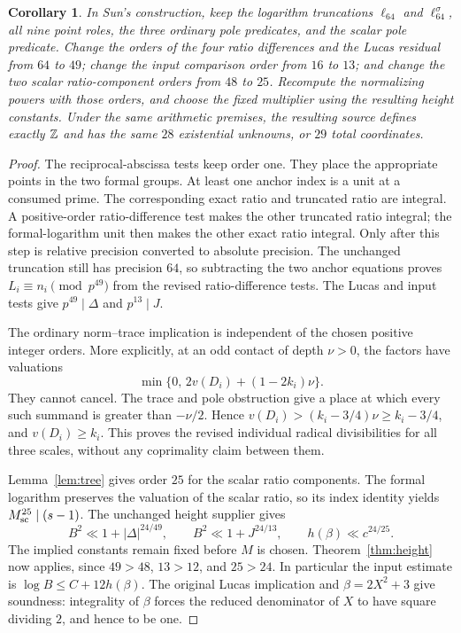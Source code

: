 \documentclass[11pt,a4paper]{article}
\newtheorem{corollary}[theorem]{Corollary}
\begin{document}
\begin{corollary}\label{cor:Sun}
In Sun's construction, keep the logarithm truncations $\ell_{64}$ and
$\ell_{64}^{\sigma}$, all nine point roles, the three ordinary pole
predicates, and the scalar pole predicate. Change the orders of the
four ratio differences and the Lucas residual from $64$ to $49$;
change the input comparison order from $16$ to $13$; and change the two
scalar ratio-component orders from $48$ to $25$.
Recompute the normalizing powers with those orders, and choose the
fixed multiplier using the resulting height constants.
Under the same arithmetic premises, the resulting source defines exactly
$\mathbb Z$ and has the same $28$ existential unknowns, or $29$ total coordinates.
\end{corollary}
\begin{proof}
The reciprocal-abscissa tests keep order one. They place the appropriate
points in the two formal groups. At least one anchor index is a unit
at a consumed prime. The corresponding exact ratio and truncated ratio
are integral. A positive-order ratio-difference test makes the other
truncated ratio integral; the formal-logarithm unit then makes the
other exact ratio integral. Only after this step is relative precision
converted to absolute precision. The unchanged truncation still has
precision $64$, so subtracting the two anchor equations proves
$L_i\equiv n_i\pmod {p^{49}}$ from the revised ratio-difference tests.
The Lucas and input tests give $p^{49}\mid\Delta$ and $p^{13}\mid J$.

The ordinary norm--trace implication is independent of the chosen
positive integer orders. More explicitly, at an odd contact of depth
$\nu>0$, the factors have valuations
\[
 \min\{0,\,2v(D_i)+(1-2k_i)\nu\}.
\]
They cannot cancel. The trace and pole obstruction give a place at
which every such summand is greater than $-\nu/2$. Hence
$v(D_i)>(k_i-3/4)\nu\ge k_i-3/4$, and $v(D_i)\ge k_i$.
This proves the revised individual radical divisibilities for all three
scales, without any coprimality claim between them.

Lemma~\ref{lem:tree} gives order $25$ for the scalar ratio components.
The formal logarithm preserves the valuation of the scalar ratio,
so its index identity yields $M_{\rm sc}^{25}\mid(s-1)$.
The unchanged height supplier gives
\[
 B^2\ll1+|\Delta|^{24/49},\qquad
 B^2\ll1+J^{24/13},\qquad h(\beta)\ll c^{24/25}.
\]
The implied constants remain fixed before $M$ is chosen. Theorem~\ref{thm:height}
now applies, since $49>48$, $13>12$, and $25>24$. In particular the
input estimate is $\log B\le C+12h(\beta)$.
The original Lucas implication and $\beta=2X^2+3$ give soundness:
integrality of $\beta$ forces the reduced denominator of $X$ to have
square dividing $2$, and hence to be one.


\end{proof}
\end{document}
